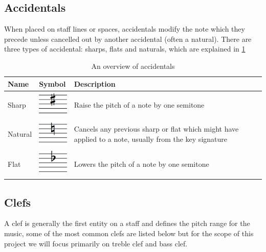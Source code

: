 \subsection{Accidentals}
\label{sec:music-theory-accidentals}
When placed on staff lines or spaces, accidentals modify the note which they precede unless cancelled out by another accidental (often a natural). There are three types of accidental: sharps, flats and naturals, which are explained in \cref{table:note-accidentals}

\begin{table}[H]
    \renewcommand{\arraystretch}{1.8}
    \centering
    \begin{tabularx}{\textwidth}{ llX }
        \toprule

        Name & Symbol & Description \\
        \midrule
        Sharp   & \includegraphics[width=1.5cm]{gfx/music-theory/accidental-sharp.png} & Raise the pitch of a note by one semitone\\
        Natural & \includegraphics[width=1.5cm]{gfx/music-theory/accidental-natural.png} & Cancels any previous sharp or flat which might have applied to a note, usually from the key signature \\
        Flat    & \includegraphics[width=1.5cm]{gfx/music-theory/accidental-flat.png} & Lowers the pitch of a note by one semitone \\
        \bottomrule
    \end{tabularx}
    \caption{An overview of accidentals}
    \label{table:note-accidentals}
\end{table}

\subsection{Clefs}
\label{sec:music-theory-clefs}

A clef is generally the first entity on a staff and defines the pitch range for the music, some of the most common clefs are listed below but for the scope of this project we will focus primarily on treble clef and bass clef.

